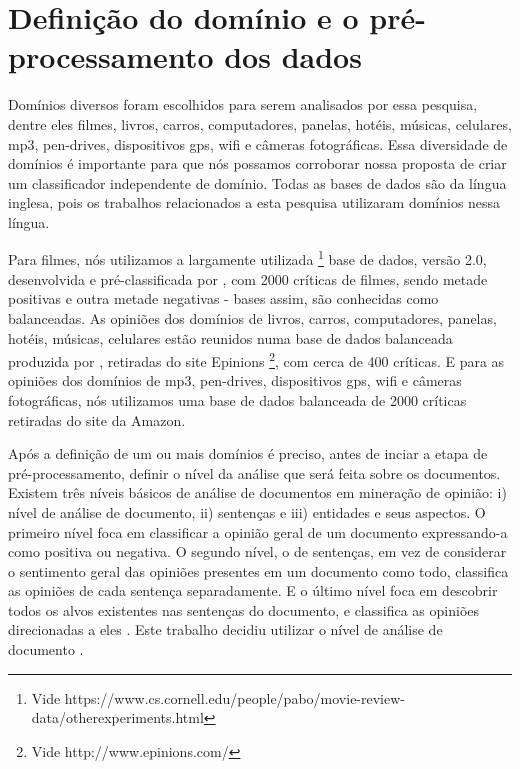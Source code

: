 \section{Definição do domínio e o pré-processamento dos dados}

Domínios diversos foram escolhidos para serem analisados por essa pesquisa, dentre eles filmes, livros, carros, computadores, panelas, hotéis, músicas, celulares, mp3, pen-drives, dispositivos gps, wifi e câmeras fotográficas. Essa diversidade de domínios é importante para que nós possamos corroborar nossa proposta de criar um classificador independente de domínio. Todas as bases de dados são da língua inglesa, pois os trabalhos relacionados a esta pesquisa utilizaram domínios nessa língua.

Para filmes, nós utilizamos a largamente utilizada \footnote{Vide https://www.cs.cornell.edu/people/pabo/movie-review-data/otherexperiments.html} base de dados, versão 2.0, desenvolvida e pré-classificada por \cite{pang2004sentimental}, com 2000 críticas de filmes, sendo metade positivas e outra metade negativas - bases assim, são conhecidas como balanceadas. As opiniões dos domínios de livros, carros, computadores, panelas, hotéis, músicas, celulares estão reunidos numa base de dados balanceada produzida por \cite{taboada2011lexicon}, retiradas do site Epinions \footnote{Vide http://www.epinions.com/}, com cerca de 400 críticas. E para as opiniões dos domínios de mp3, pen-drives, dispositivos gps, wifi e câmeras fotográficas, nós utilizamos uma base de dados balanceada de 2000 críticas retiradas do site da Amazon. 

Após a definição de um ou mais domínios é preciso, antes de inciar a etapa de pré-processamento, definir o nível da análise que será feita sobre os documentos. Existem três níveis básicos de análise de documentos em mineração de opinião: i) nível de análise de documento, ii) sentenças e iii) entidades e seus aspectos. O primeiro nível foca em classificar a opinião geral de um documento expressando-a como positiva ou negativa. O segundo nível, o de sentenças, em vez de considerar o sentimento geral das opiniões presentes em um documento como todo, classifica as opiniões de cada sentença separadamente. E o último nível foca em descobrir todos os alvos existentes nas sentenças do documento, e classifica as opiniões direcionadas a eles \cite{bing:2012}. Este trabalho decidiu utilizar o nível de análise de documento \cite{joachims1998text, pang2002thumbs, gamon2004sentiment, mullen2004sentiment, pang2004sentimental, cui2006comparative}.

